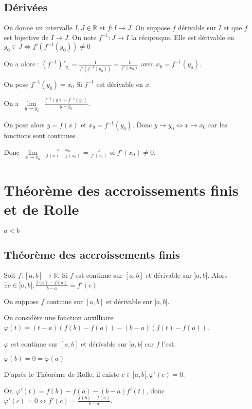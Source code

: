 \documentclass[french]{yLectureNote}
\newcommand{\Lim}[1]{\lim\limits_{\substack{#1}}\:}
\begin{document}
\subsection{Dérivées}

\begin{theorem}
On donne un intervalle $I,J\in\mathbb{R}$ et $f:I\to J$. On suppose $f$ dérivable sur $I$ et que $f$ est bijective de $I\to J$. On note $f^{-1} :J\to I$ la réciproque. Elle est dérivable en $y_0\in J \iff f'(f^{-1}(y_0))\neq 0$

On a alors : $(f^{-1})'_{y_0} = \frac{1}{f'(f^{-1}(y_0))} = \frac{1}{f'(x_0)}$ avec $x_0 = f^{-1}(y_0)$.
\end{theorem}
\begin{myproof}
On pose $f^{-1}(y_0) = x_0$ Si $f^{-1}$ est dérivable en $x$.

On a $\Lim{y\to y_0}\frac{f^{-1}(y)-f^{-1}(y_0)}{y-y_0}$.

On pose alors $ y = f(x)$ et $x_0 = f^{-1}(y_0)$. Donc $y\to y_0 \iff x\to x_0$ car les fonctions sont continues.

Donc $\Lim{x\to x_0} \frac{x-x_0}{f(x)-f(x_0)} = \frac{1}{f'(x_0)}$ si $f'(x_0)\neq 0$.
\end{myproof}
\section{Théorème des accroissements finis et de Rolle}
$a<b$
\subsection{Théorème des accroissements finis}
\begin{theorem}[]
Soit $f:[a,b]\to \mathbb{R}$. Si $f$ est continue sur $[a,b]$ et dérivable sur $]a,b[$. Alors $\exists c\in]a,b[, \frac{f(b)-f(a)}{b-a} = f'(c)$
\end{theorem}

\begin{myproof}
On suppose $f$ continue sur $[a,b]$ et dérivable sur $]a,b[$.

On considère une fonction auxilliaire $\varphi(t) = (t-a)(f(b)-f(a)) - (b-a)(f(t)-f(a))$.

$\varphi$ est continue sur $[a,b]$ et dérivable sur $]a,b[$ car $f$ l'est.

$\varphi(b) = 0 = \varphi(a)$

D'après le Théorème de Rolle, il existe $c\in]a,b[, \varphi'(c) = 0$.

Or, $\varphi'(t) = f(b)-f(a) - (b-a)f'(t)$, donc $\varphi'(c) = 0 \iff f'(c) = \frac{f(b)-f(a)}{b-a}$.
\end{myproof}
\end{document}
